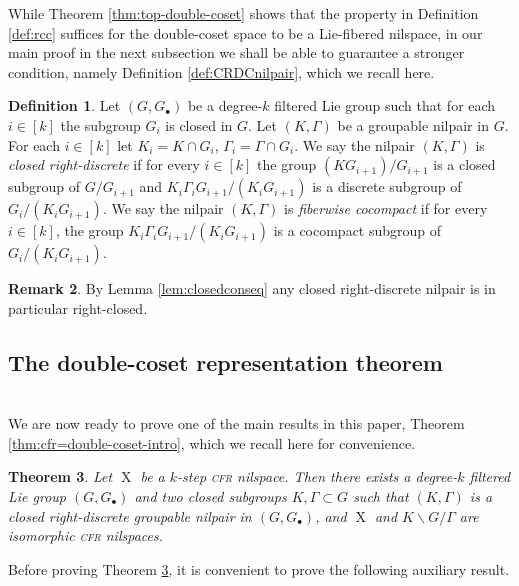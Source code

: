\documentclass[a4paper,12pt,reqno]{amsart}
\newtheorem{theorem}{Theorem}[section]
\theoremstyle{definition}
\newtheorem{defn}[theorem]{Definition}
\newtheorem{remark}[theorem]{Remark}
\DeclareMathOperator{\ns}{X}
\begin{document}
\noindent While Theorem \ref{thm:top-double-coset} shows that the property in Definition \ref{def:rcc} suffices for the double-coset space to be a Lie-fibered nilspace, in our main proof in the next subsection we shall be able to guarantee  a stronger condition, namely Definition \ref{def:CRDCnilpair}, which we recall here.
\begin{defn}
Let $(G,G_\bullet)$ be a degree-$k$ filtered Lie group such that for each $i\in[k]$ the subgroup $G_i$ is closed in $G$. Let $(K,\Gamma)$ be a groupable nilpair in $G$. For each $i\in [k]$ let $K_i=K\cap G_i$, $\Gamma_i=\Gamma\cap G_i$. We say the nilpair $(K,\Gamma)$ is \emph{closed right-discrete} if for every $i\in[k]$ the group $(KG_{i+1})/G_{i+1}$ is a closed subgroup of $G/G_{i+1}$ and $K_i \Gamma_i G_{i+1} /(K_iG_{i+1})$ is a discrete subgroup of $G_i/(K_iG_{i+1})$. We say the nilpair $(K,\Gamma)$ is \emph{fiberwise cocompact} if for every $i\in[k]$, the group $K_i\Gamma_iG_{i+1}/(K_iG_{i+1})$ is a cocompact subgroup of $G_i/(K_iG_{i+1})$.
\end{defn}


\begin{remark}\label{rem:closed-right-discrete-implies-right-closed}
By Lemma \ref{lem:closedconseq} any closed right-discrete nilpair is in particular right-closed.
\end{remark}



\subsection{The double-coset representation theorem}\label{subsec:DoubleCosetRep}\hfill\smallskip\\
We are now ready to prove one of the main results in this paper, Theorem \ref{thm:cfr=double-coset-intro}, which we recall here for convenience.

\begin{theorem}\label{thm:cfr=double-coset}
Let $\ns$ be a $k$-step \textsc{cfr} nilspace. Then there exists a degree-$k$ filtered Lie group $(G,G_\bullet)$ and two closed subgroups $K,\Gamma\subset G$ such that $(K,\Gamma)$ is a closed right-discrete groupable nilpair in $(G,G_\bullet)$, and $\ns$ and $K\backslash G/ \Gamma$ are isomorphic \textsc{cfr} nilspaces.
\end{theorem}
\noindent Before proving Theorem \ref{thm:cfr=double-coset}, it is convenient to prove the following auxiliary result.
\end{document}

